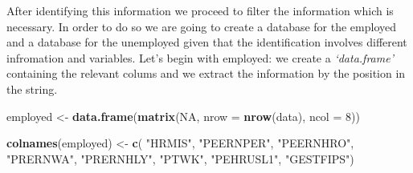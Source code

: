 \documentclass[]{book}
\newenvironment{Shaded}{\begin{snugshade}}{\end{snugshade}}
\newcommand{\KeywordTok}[1]{\textcolor[rgb]{0.13,0.29,0.53}{\textbf{#1}}}
\newcommand{\DataTypeTok}[1]{\textcolor[rgb]{0.13,0.29,0.53}{#1}}
\newcommand{\DecValTok}[1]{\textcolor[rgb]{0.00,0.00,0.81}{#1}}
\newcommand{\StringTok}[1]{\textcolor[rgb]{0.31,0.60,0.02}{#1}}
\newcommand{\OtherTok}[1]{\textcolor[rgb]{0.56,0.35,0.01}{#1}}
\newcommand{\NormalTok}[1]{#1}
\begin{document}
After identifying this information we proceed to filter the information
which is necessary. In order to do so we are going to create a database
for the employed and a database for the unemployed given that the
identification involves different infromation and variables. Let's begin
with employed: we create a \emph{`data.frame'} containing the relevant
colums and we extract the information by the position in the string.

\begin{Shaded}
\begin{Highlighting}[]
\NormalTok{employed <-}\StringTok{ }\KeywordTok{data.frame}\NormalTok{(}\KeywordTok{matrix}\NormalTok{(}\OtherTok{NA}\NormalTok{, }\DataTypeTok{nrow =} \KeywordTok{nrow}\NormalTok{(data), }\DataTypeTok{ncol =} \DecValTok{8}\NormalTok{))}

\KeywordTok{colnames}\NormalTok{(employed) <-}\StringTok{ }\KeywordTok{c}\NormalTok{(  }\StringTok{"HRMIS"}\NormalTok{,}
                          \StringTok{"PEERNPER"}\NormalTok{,}
                          \StringTok{"PEERNHRO"}\NormalTok{,}
                          \StringTok{"PRERNWA"}\NormalTok{,}
                          \StringTok{"PRERNHLY"}\NormalTok{,}
                          \StringTok{"PTWK"}\NormalTok{,}
                          \StringTok{"PEHRUSL1"}\NormalTok{,}
                          \StringTok{"GESTFIPS"}\NormalTok{)}


\end{Highlighting}
\end{Shaded}
\end{document}
